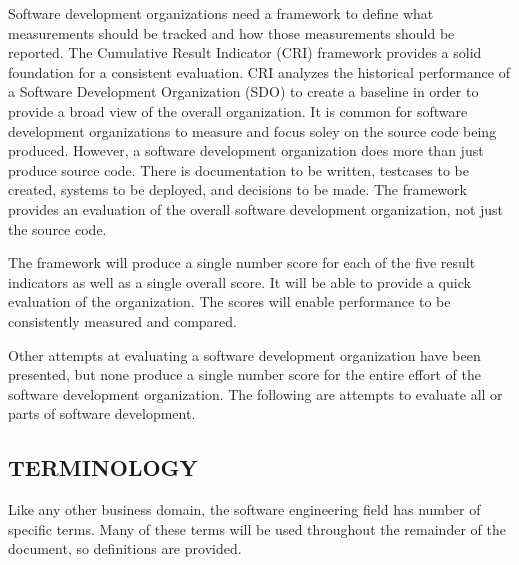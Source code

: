 \documentclass[SDSUThesis.tex]{subfiles}
\begin{document}
    Software development organizations need a framework to define
    what measurements should be tracked and how those measurements
    should be reported.  The Cumulative Result Indicator (CRI)
    framework provides a solid foundation
    for a consistent evaluation.  CRI analyzes the historical performance
    of a Software Development Organization (SDO)
    to create a baseline in order to provide a broad
    view of the overall organization.  It is common for software development
    organizations to measure and focus soley on the source code
    being produced.  However, a software development organization does more
    than just produce source code.  There is documentation to be
    written, testcases to be created, systems to be deployed, and
    decisions to be made.  The framework provides an evaluation
    of the overall software development organization, not just the
    source code.
    
    The framework will produce a single number score for each of 
    the five result indicators as well as a single overall score.  
    It will be able to provide a quick evaluation of the organization.
    The scores will enable performance to be consistently measured
    and compared.

    Other attempts at evaluating a software development organization
    have been presented, but none produce a single number score for
    the entire effort of the software development organization. 
    The following are attempts to evaluate all or parts of 
    software development.


\subsection{TERMINOLOGY}
    Like any other business domain, the software engineering field has number
    of specific terms.  Many of these terms will be used throughout the remainder
    of the document, so definitions are provided.  
\end{document}
